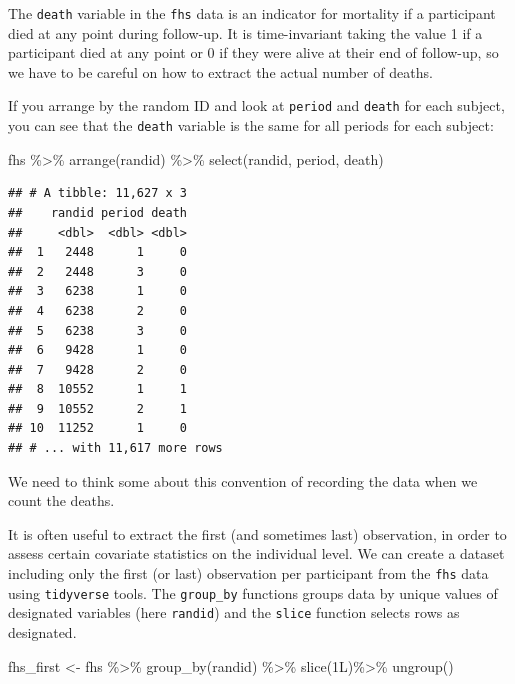 \documentclass[
]{book}
\newenvironment{Shaded}{\begin{snugshade}}{\end{snugshade}}
\newcommand{\FunctionTok}[1]{\textcolor[rgb]{0.00,0.00,0.00}{#1}}
\newcommand{\NormalTok}[1]{#1}
\newcommand{\OtherTok}[1]{\textcolor[rgb]{0.56,0.35,0.01}{#1}}
\newcommand{\SpecialCharTok}[1]{\textcolor[rgb]{0.00,0.00,0.00}{#1}}
\begin{document}
The \texttt{death} variable in the \texttt{fhs} data is an indicator for mortality if a participant died at any point during follow-up. It is time-invariant taking the value 1 if a participant died at any point or 0 if they were alive at their end of follow-up, so we have to be careful on how to extract the actual number of deaths.

If you arrange by the random ID and look at \texttt{period} and \texttt{death} for each subject,
you can see that the \texttt{death} variable is the same for all periods for each
subject:

\begin{Shaded}
\begin{Highlighting}[]
\NormalTok{fhs }\SpecialCharTok{\%\textgreater{}\%} 
  \FunctionTok{arrange}\NormalTok{(randid) }\SpecialCharTok{\%\textgreater{}\%} 
  \FunctionTok{select}\NormalTok{(randid, period, death)}
\end{Highlighting}
\end{Shaded}

\begin{verbatim}
## # A tibble: 11,627 x 3
##    randid period death
##     <dbl>  <dbl> <dbl>
##  1   2448      1     0
##  2   2448      3     0
##  3   6238      1     0
##  4   6238      2     0
##  5   6238      3     0
##  6   9428      1     0
##  7   9428      2     0
##  8  10552      1     1
##  9  10552      2     1
## 10  11252      1     0
## # ... with 11,617 more rows
\end{verbatim}

We need to think some about this convention of recording the data when we count
the deaths.

It is often useful to extract the first (and sometimes last) observation, in order to assess certain covariate statistics on the individual level. We can create a dataset including only the first (or last) observation per participant from the \texttt{fhs} data using \texttt{tidyverse} tools. The \texttt{group\_by} functions groups data by unique values of designated variables (here \texttt{randid}) and the \texttt{slice} function selects rows as designated.

\begin{Shaded}
\begin{Highlighting}[]
\NormalTok{fhs\_first }\OtherTok{\textless{}{-}}\NormalTok{ fhs }\SpecialCharTok{\%\textgreater{}\%} 
  \FunctionTok{group\_by}\NormalTok{(randid) }\SpecialCharTok{\%\textgreater{}\%} 
  \FunctionTok{slice}\NormalTok{(1L)}\SpecialCharTok{\%\textgreater{}\%}
  \FunctionTok{ungroup}\NormalTok{()}
\end{Highlighting}
\end{Shaded}
\end{document}

